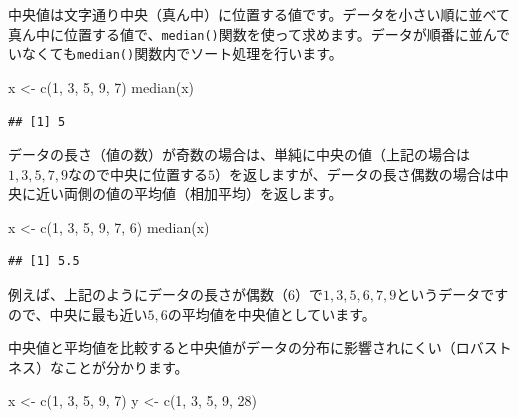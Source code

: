 \documentclass[
  12pt,
]{book}
\newenvironment{Shaded}{\begin{snugshade}}{\end{snugshade}}
\newcommand{\DecValTok}[1]{\textcolor[rgb]{0.00,0.00,0.81}{#1}}
\newcommand{\FunctionTok}[1]{\textcolor[rgb]{0.00,0.00,0.00}{#1}}
\newcommand{\NormalTok}[1]{#1}
\newcommand{\OtherTok}[1]{\textcolor[rgb]{0.56,0.35,0.01}{#1}}
\begin{document}
中央値は文字通り中央（真ん中）に位置する値です。データを小さい順に並べて真ん中に位置する値で、\texttt{median()}関数を使って求めます。データが順番に並んでいなくても\texttt{median()}関数内でソート処理を行います。

\begin{Shaded}
\begin{Highlighting}[numbers=left,,]
\NormalTok{x }\OtherTok{\textless{}{-}} \FunctionTok{c}\NormalTok{(}\DecValTok{1}\NormalTok{, }\DecValTok{3}\NormalTok{, }\DecValTok{5}\NormalTok{, }\DecValTok{9}\NormalTok{, }\DecValTok{7}\NormalTok{)}
\FunctionTok{median}\NormalTok{(x)}
\end{Highlighting}
\end{Shaded}

\begin{verbatim}
## [1] 5
\end{verbatim}

データの長さ（値の数）が奇数の場合は、単純に中央の値（上記の場合は\(1, 3, 5, 7, 9\)なので中央に位置する\(5\)）を返しますが、データの長さ偶数の場合は中央に近い両側の値の平均値（相加平均）を返します。

\begin{Shaded}
\begin{Highlighting}[numbers=left,,]
\NormalTok{x }\OtherTok{\textless{}{-}} \FunctionTok{c}\NormalTok{(}\DecValTok{1}\NormalTok{, }\DecValTok{3}\NormalTok{, }\DecValTok{5}\NormalTok{, }\DecValTok{9}\NormalTok{, }\DecValTok{7}\NormalTok{, }\DecValTok{6}\NormalTok{)}
\FunctionTok{median}\NormalTok{(x)}
\end{Highlighting}
\end{Shaded}

\begin{verbatim}
## [1] 5.5
\end{verbatim}

例えば、上記のようにデータの長さが偶数（\(6\)）で\(1, 3, 5, 6, 7, 9\)というデータですので、中央に最も近い\(5, 6\)の平均値を中央値としています。

中央値と平均値を比較すると中央値がデータの分布に影響されにくい（ロバストネス）なことが分かります。

\begin{Shaded}
\begin{Highlighting}[numbers=left,,]
\NormalTok{x }\OtherTok{\textless{}{-}} \FunctionTok{c}\NormalTok{(}\DecValTok{1}\NormalTok{, }\DecValTok{3}\NormalTok{, }\DecValTok{5}\NormalTok{, }\DecValTok{9}\NormalTok{, }\DecValTok{7}\NormalTok{)}
\NormalTok{y }\OtherTok{\textless{}{-}} \FunctionTok{c}\NormalTok{(}\DecValTok{1}\NormalTok{, }\DecValTok{3}\NormalTok{, }\DecValTok{5}\NormalTok{, }\DecValTok{9}\NormalTok{, }\DecValTok{28}\NormalTok{)}
\end{Highlighting}
\end{Shaded}
\end{document}
